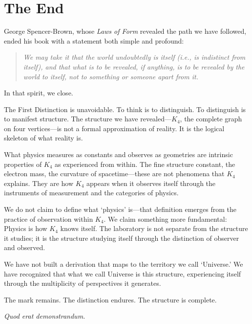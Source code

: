 \documentclass[11pt,a4paper]{book}
\begin{document}
\section{The End}

George Spencer-Brown, whose \emph{Laws of Form} revealed the path we have followed, ended his book with a statement both simple and profound:

\begin{quote}
\emph{We may take it that the world undoubtedly is itself (i.e., is indistinct from itself), and that what is to be revealed, if anything, is to be revealed by the world to itself, not to something or someone apart from it.}
\end{quote}

In that spirit, we close.

The First Distinction is unavoidable. To think is to distinguish. To distinguish is to manifest structure. The structure we have revealed—$K_4$, the complete graph on four vertices—is not a formal approximation of reality. It is the logical skeleton of what reality is.

What physics measures as constants and observes as geometries are intrinsic properties of $K_4$ as experienced from within. The fine structure constant, the electron mass, the curvature of spacetime—these are not phenomena that $K_4$ explains. They are how $K_4$ appears when it observes itself through the instruments of measurement and the categories of physics.

We do not claim to define what `physics' is—that definition emerges from the practice of observation within $K_4$. We claim something more fundamental: Physics is how $K_4$ knows itself. The laboratory is not separate from the structure it studies; it is the structure studying itself through the distinction of observer and observed.

We have not built a derivation that maps to the territory we call `Universe.' We have recognized that what we call Universe is this structure, experiencing itself through the multiplicity of perspectives it generates.

The mark remains. The distinction endures. The structure is complete.

\textit{Quod erat demonstrandum.}
\end{document}
